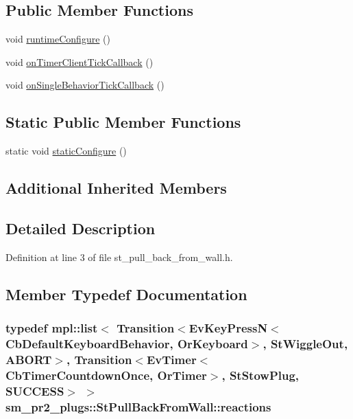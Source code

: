 \subsection*{Public Member Functions}
\begin{DoxyCompactItemize}
\item 
void \hyperlink{structsm__pr2__plugs_1_1StPullBackFromWall_a1be08c0cdc17a5c038cd8549118f98a6}{runtime\+Configure} ()
\item 
void \hyperlink{structsm__pr2__plugs_1_1StPullBackFromWall_a7872156a77c675539830c016e703c499}{on\+Timer\+Client\+Tick\+Callback} ()
\item 
void \hyperlink{structsm__pr2__plugs_1_1StPullBackFromWall_a42e04e36271bd14285b42df5c1988209}{on\+Single\+Behavior\+Tick\+Callback} ()
\end{DoxyCompactItemize}
\subsection*{Static Public Member Functions}
\begin{DoxyCompactItemize}
\item 
static void \hyperlink{structsm__pr2__plugs_1_1StPullBackFromWall_ac2b8294a8c707ed4a4bb867fac511f7f}{static\+Configure} ()
\end{DoxyCompactItemize}
\subsection*{Additional Inherited Members}


\subsection{Detailed Description}


Definition at line 3 of file st\+\_\+pull\+\_\+back\+\_\+from\+\_\+wall.\+h.



\subsection{Member Typedef Documentation}
\subsubsection[{\texorpdfstring{reactions}{reactions}}]{\setlength{\rightskip}{0pt plus 5cm}typedef mpl\+::list$<$ Transition$<$Ev\+Key\+PressN$<$Cb\+Default\+Keyboard\+Behavior, {\bf Or\+Keyboard}$>$, {\bf St\+Wiggle\+Out}, {\bf A\+B\+O\+RT}$>$, Transition$<$Ev\+Timer$<$Cb\+Timer\+Countdown\+Once, {\bf Or\+Timer}$>$, {\bf St\+Stow\+Plug}, {\bf S\+U\+C\+C\+E\+SS}$>$ $>$ {\bf sm\+\_\+pr2\+\_\+plugs\+::\+St\+Pull\+Back\+From\+Wall\+::reactions}}\hypertarget{structsm__pr2__plugs_1_1StPullBackFromWall_ae98bee2aa33bf23dc67a168be155e495}{}\label{structsm__pr2__plugs_1_1StPullBackFromWall_ae98bee2aa33bf23dc67a168be155e495}


